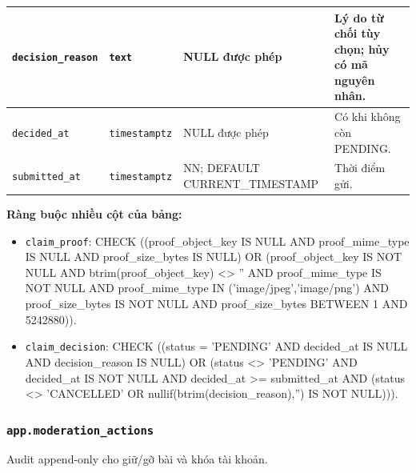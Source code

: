\begin{longtable}{|>{\raggedright\arraybackslash}p{.20\linewidth}|>{\raggedright\arraybackslash}p{.14\linewidth}|>{\raggedright\arraybackslash}p{.31\linewidth}|>{\raggedright\arraybackslash}p{.27\linewidth}|}
\texttt{decision\_\allowbreak{}reason} & \texttt{text} & NULL được phép & Lý do từ chối tùy chọn; hủy có mã nguyên nhân. \\ \hline

\texttt{decided\_\allowbreak{}at} & \texttt{timestamptz} & NULL được phép & Có khi không còn PENDING. \\ \hline

\texttt{submitted\_\allowbreak{}at} & \texttt{timestamptz} & NN; DEFAULT CURRENT\_\allowbreak{}TIMESTAMP & Thời điểm gửi. \\ \hline

\end{longtable}

\textbf{Ràng buộc nhiều cột của bảng:}

\begin{itemize}

\item \texttt{claim\_\allowbreak{}proof}: CHECK ((proof\_\allowbreak{}object\_\allowbreak{}key IS NULL AND proof\_\allowbreak{}mime\_\allowbreak{}type IS NULL AND proof\_\allowbreak{}size\_\allowbreak{}bytes IS NULL) OR (proof\_\allowbreak{}object\_\allowbreak{}key IS NOT NULL AND btrim(proof\_\allowbreak{}object\_\allowbreak{}key) <> '' AND proof\_\allowbreak{}mime\_\allowbreak{}type IS NOT NULL AND proof\_\allowbreak{}mime\_\allowbreak{}type IN ('image/jpeg',\allowbreak{}'image/png') AND proof\_\allowbreak{}size\_\allowbreak{}bytes IS NOT NULL AND proof\_\allowbreak{}size\_\allowbreak{}bytes BETWEEN 1 AND 5242880)).

\item \texttt{claim\_\allowbreak{}decision}: CHECK ((status = 'PENDING' AND decided\_\allowbreak{}at IS NULL AND decision\_\allowbreak{}reason IS NULL) OR (status <> 'PENDING' AND decided\_\allowbreak{}at IS NOT NULL AND decided\_\allowbreak{}at >= submitted\_\allowbreak{}at AND (status <> 'CANCELLED' OR nullif(btrim(decision\_\allowbreak{}reason),\allowbreak{}'') IS NOT NULL))).

\end{itemize}

\subsubsection*{\texttt{app.moderation\_\allowbreak{}actions}}

Audit append-only cho giữ/gỡ bài và khóa tài khoản.

